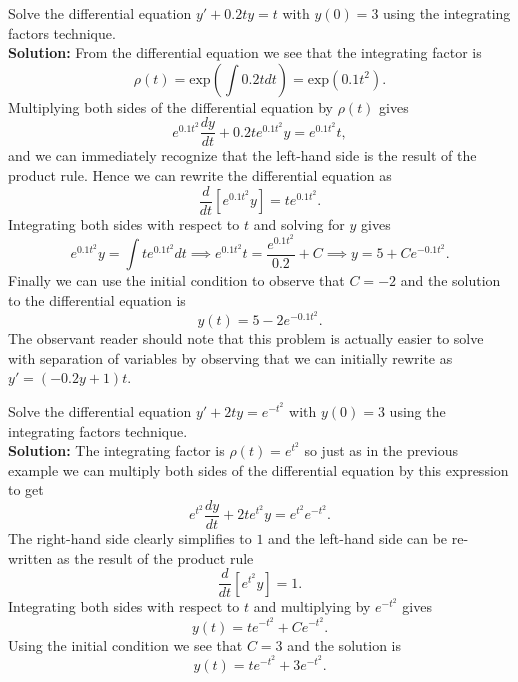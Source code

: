 \begin{example}
    Solve the differential equation $y' + 0.2ty = t$ with $y(0) = 3$ using the integrating
    factors technique.\\
    {\bf Solution: } From the differential equation we see that the integrating factor is
    \[ \rho(t) = \text{exp}\left( \int 0.2t dt \right) =
        \text{exp}\left( 0.1t^2 \right). \]
    Multiplying both sides of the differential equation by $\rho(t)$ gives
    \[ e^{0.1t^2} \frac{dy}{dt} + 0.2 t e^{0.1t^2} y = e^{0.1t^2} t, \]
    and we can immediately recognize that the left-hand side is the result of the product
    rule.  Hence we can rewrite the differential equation as
    \[ \frac{d}{dt}\left[ e^{0.1t^2} y \right] = te^{0.1t^2}. \]
    Integrating both sides with respect to $t$ and solving for $y$ gives 
    \[ e^{0.1t^2} y = \int t e^{0.1t^2} dt \implies e^{0.1t^2} t = \frac{e^{0.1t^2}}{0.2}
        + C \implies y = 5 + C e^{-0.1t^2}. \]
    Finally we can use the initial condition to observe that $C = -2$ and the solution to
    the differential equation is 
    \[ \boxed{y(t) = 5 - 2 e^{-0.1t^2}. } \]
    The observant reader should note that this problem is actually easier to solve with
    separation of variables by observing that we can initially rewrite as $y' = (-0.2y + 1
    )t$.
\end{example}

\begin{example}
    Solve the differential equation $y' + 2ty = e^{-t^2}$ with $y(0) = 3$ using the
    integrating factors technique. \\
    {\bf Solution:} The integrating factor is $\rho(t) = e^{t^2}$ so just as in the
    previous example we can multiply both sides of the differential equation by this
    expression to get 
    \[ e^{t^2} \frac{dy}{dt} + 2te^{t^2} y = e^{t^2} e^{-t^2}. \]
    The right-hand side clearly simplifies to $1$ and the left-hand side can be
    re-written as the result of the product rule
    \[ \frac{d}{dt} \left[ e^{t^2} y \right] = 1. \]
    Integrating both sides with respect to $t$ and multiplying by $e^{-t^2}$ gives
    \[ y(t) = te^{-t^2} + Ce^{-t^2}. \]
    Using the initial condition we see that $C = 3$ and the solution is
    \[ \boxed{y(t) = te^{-t^2} + 3e^{-t^2}.} \]
\end{example}



